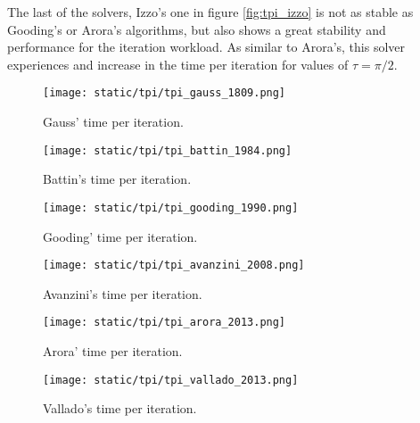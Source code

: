 The last of the solvers, Izzo's one in figure \ref{fig:tpi_izzo} is not as
stable as Gooding's or Arora's algorithms, but also shows a great stability and
performance for the iteration workload. As similar to Arora's, this solver
experiences and increase in the time per iteration for values of $\tau=\pi/2$.


\begin{figure}[H]
  \begin{minipage}{0.48\textwidth}
    \centering
    \texttt{[image: static/tpi/tpi\_gauss\_1809.png]}
    \caption{Gauss' time per iteration.}\label{fig:tpi_gauss}
  \end{minipage}\hfill
  \begin{minipage}{0.48\textwidth}
    \centering
    \texttt{[image: static/tpi/tpi\_battin\_1984.png]}
    \caption{Battin's time per iteration.}\label{fig:tpi_battin}
  \end{minipage}
\end{figure}

\begin{figure}[H]
  \begin{minipage}{0.48\textwidth}
    \centering
    \texttt{[image: static/tpi/tpi\_gooding\_1990.png]}
    \caption{Gooding' time per iteration.}\label{fig:tpi_gooding}
  \end{minipage}\hfill
  \begin{minipage}{0.48\textwidth}
    \centering
    \texttt{[image: static/tpi/tpi\_avanzini\_2008.png]}
    \caption{Avanzini's time per iteration.}\label{fig:tpi_avanzini}
  \end{minipage}
\end{figure}

\begin{figure}[H]
  \begin{minipage}{0.48\textwidth}
    \centering
    \texttt{[image: static/tpi/tpi\_arora\_2013.png]}
    \caption{Arora' time per iteration.}\label{fig:tpi_arora}
  \end{minipage}\hfill
  \begin{minipage}{0.48\textwidth}
    \centering
    \texttt{[image: static/tpi/tpi\_vallado\_2013.png]}
    \caption{Vallado's time per iteration.}\label{fig:tpi_vallado}
  \end{minipage}
\end{figure}

